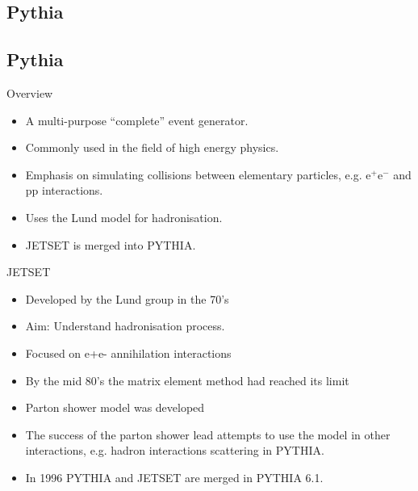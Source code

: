 \subsection{Pythia}
\label{section: pythia}

%
%
%
%
%

\subsection*{Pythia}
Overview
\begin{itemize}
   \item A multi-purpose ``complete'' event generator.
   \item Commonly used in the field of high energy physics.
   \item Emphasis on simulating collisions between elementary particles, e.g. $\mathrm{e}^+\mathrm{e}^-$ and $\mathrm{pp}$ interactions.
   \item Uses the Lund model for hadronisation.
   \item JETSET is merged into PYTHIA.
\end{itemize}

JETSET
\begin{itemize}
  \item Developed by the Lund group in the 70's
  \item Aim: Understand hadronisation process.
  \item Focused on e+e- annihilation interactions
  \item By the mid 80's the matrix element method had reached its limit
  \item Parton shower model was developed
  \item The success of the parton shower lead attempts to use the model in other interactions, e.g. hadron interactions scattering in PYTHIA.
  \item In 1996 PYTHIA and JETSET are merged in PYTHIA 6.1.
\end{itemize}

